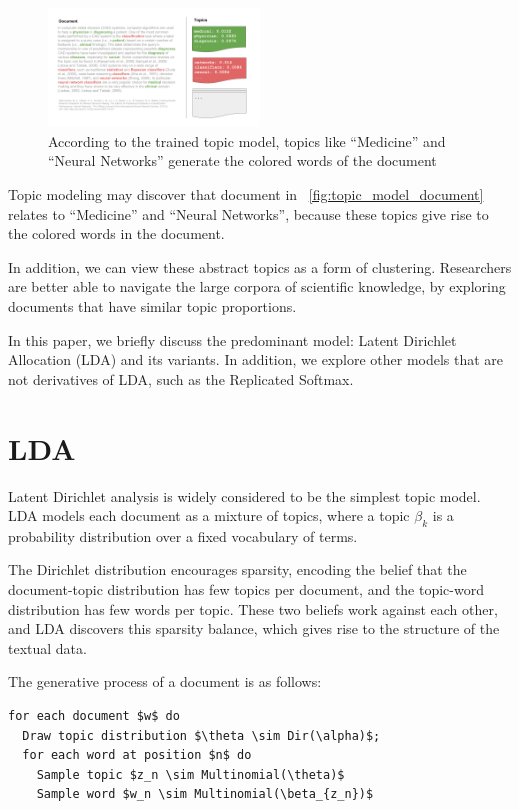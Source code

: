 \documentclass[letterpaper]{article}
\begin{document}
\begin{figure}[ht]
  \centering
  \includegraphics[width=0.5\textwidth]{topic_models.png}
  \caption{\label{fig:topic_model_document} According to the trained
    topic model, topics like ``Medicine'' and ``Neural Networks''
    generate the colored words of the document}
\end{figure}

Topic modeling may discover that document in
~\autoref{fig:topic_model_document} relates to ``Medicine'' and
``Neural Networks'', because these topics give rise to the colored
words in the document.

In addition, we can view these abstract topics as a form of clustering.
Researchers are better able to navigate the large corpora of
scientific knowledge, by exploring documents that have similar topic
proportions.

In this paper, we briefly discuss the predominant model: Latent
Dirichlet Allocation (LDA) and its variants. In addition, we explore
other models that are not derivatives of LDA, such as the Replicated
Softmax.

\section{LDA}
Latent Dirichlet analysis is widely considered to be the simplest
topic model. LDA models each document as a mixture of topics, where a
topic $\beta_k$ is a probability distribution over a fixed vocabulary
of terms.

The Dirichlet distribution encourages sparsity, encoding the belief
that the document-topic distribution has few topics per document, and
the topic-word distribution has few words per topic. These two beliefs
work against each other, and LDA discovers this sparsity balance,
which gives rise to the structure of the textual data.

The generative process of a document is as follows:

\begin{lstlisting}[mathescape=true]
for each document $w$ do
  Draw topic distribution $\theta \sim Dir(\alpha)$;
  for each word at position $n$ do
    Sample topic $z_n \sim Multinomial(\theta)$
    Sample word $w_n \sim Multinomial(\beta_{z_n})$
\end{lstlisting}
\end{document}

